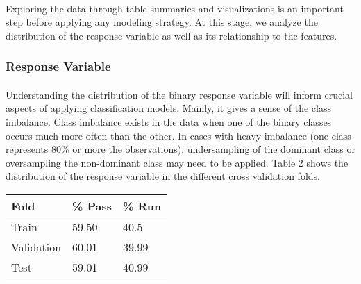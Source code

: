 \documentclass[11pt]{article}
\begin{document}
\begin{multicols*}{2}
            \paragraph{}
                Exploring the data through table summaries and visualizations is an important step before applying any modeling strategy.
                At this stage, we analyze the distribution of the response variable as well as its relationship to the features.

            \vspace{-5pt}

            \subsubsection*{Response Variable}
                \paragraph{}
                    Understanding the distribution of the binary response variable will inform crucial aspects of applying classification models.
                    Mainly, it gives a sense of the class imbalance. 
                    Class imbalance exists in the data when one of the binary classes occurs much more often than the other. 
                    In cases with heavy imbalance (one class represents 80\% or more the observations), undersampling of the dominant class or oversampling the non-dominant class may need to be applied.
                    Table 2 shows the distribution of the response variable in the different cross validation folds.  
                
                \vspace{15pt}
                
                \begin{tabular}{|| m{2cm} | m{2cm}| m{2cm} ||}
                    \hline
                    \textbf{Fold} & \textbf{\% Pass} & \textbf{\% Run}  \\
                    \hline\hline
                    Train  & 59.50 & 40.5 \\
                    \hline
                    Validation & 60.01 & 39.99 \\
                    \hline
                    Test & 59.01 & 40.99 \\
                    \hline
                \end{tabular}
                

\end{multicols*}
\end{document}
